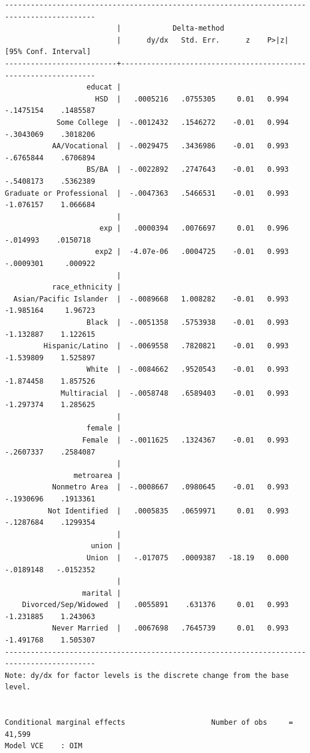 \documentclass[
]{book}
\begin{document}
\begin{verbatim}
-------------------------------------------------------------------------------------------
                          |            Delta-method
                          |      dy/dx   Std. Err.      z    P>|z|     [95% Conf. Interval]
--------------------------+----------------------------------------------------------------
                   educat |
                     HSD  |   .0005216   .0755305     0.01   0.994    -.1475154    .1485587
            Some College  |  -.0012432   .1546272    -0.01   0.994    -.3043069    .3018206
           AA/Vocational  |  -.0029475   .3436986    -0.01   0.993    -.6765844    .6706894
                   BS/BA  |  -.0022892   .2747643    -0.01   0.993    -.5408173    .5362389
Graduate or Professional  |  -.0047363   .5466531    -0.01   0.993    -1.076157    1.066684
                          |
                      exp |   .0000394   .0076697     0.01   0.996     -.014993    .0150718
                     exp2 |  -4.07e-06   .0004725    -0.01   0.993    -.0009301     .000922
                          |
           race_ethnicity |
  Asian/Pacific Islander  |  -.0089668   1.008282    -0.01   0.993    -1.985164     1.96723
                   Black  |  -.0051358   .5753938    -0.01   0.993    -1.132887    1.122615
         Hispanic/Latino  |  -.0069558   .7820821    -0.01   0.993    -1.539809    1.525897
                   White  |  -.0084662   .9520543    -0.01   0.993    -1.874458    1.857526
             Multiracial  |  -.0058748   .6589403    -0.01   0.993    -1.297374    1.285625
                          |
                   female |
                  Female  |  -.0011625   .1324367    -0.01   0.993    -.2607337    .2584087
                          |
                metroarea |
           Nonmetro Area  |  -.0008667   .0980645    -0.01   0.993    -.1930696    .1913361
          Not Identified  |   .0005835   .0659971     0.01   0.993    -.1287684    .1299354
                          |
                    union |
                   Union  |   -.017075   .0009387   -18.19   0.000    -.0189148   -.0152352
                          |
                  marital |
    Divorced/Sep/Widowed  |   .0055891    .631376     0.01   0.993    -1.231885    1.243063
           Never Married  |   .0067698   .7645739     0.01   0.993    -1.491768    1.505307
-------------------------------------------------------------------------------------------
Note: dy/dx for factor levels is the discrete change from the base level.


Conditional marginal effects                    Number of obs     =     41,599
Model VCE    : OIM


\end{verbatim}
\end{document}
